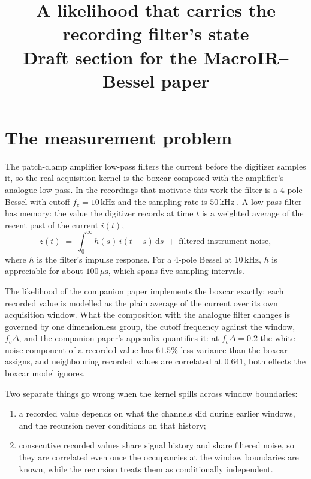 \documentclass[11pt]{article}
\title{A likelihood that carries the recording filter's state\\[4pt]
Draft section for the MacroIR--Bessel paper}
\author{}
\date{}
\begin{document}
\maketitle

\newcommand{\E}{\mathbb{E}}
\newcommand{\Var}{\operatorname{Var}}
\newcommand{\Cov}{\operatorname{Cov}}
\newcommand{\diag}{\operatorname{diag}}
\newcommand{\Nch}{N_{\mathrm{ch}}}
\newcommand{\N}{\mathbf{N}}
\newcommand{\ff}{\bm{\varphi}}
\newcommand{\Af}{\mathbf{A}_{\mathrm{f}}}
\newcommand{\bff}{\mathbf{b}_{\mathrm{f}}}
\newcommand{\cf}{\mathbf{c}_{\mathrm{f}}}

\section{The measurement problem}

The patch-clamp amplifier low-pass filters the current before the digitizer
samples it, so the real acquisition kernel is the boxcar composed with the
amplifier's analogue low-pass. In the recordings that motivate this work
the filter is a 4-pole Bessel with cutoff $f_c = 10\,\mathrm{kHz}$ and the
sampling rate is $50\,\mathrm{kHz}$ \cite{moffatt2007}. A low-pass filter
has memory: the value the digitizer records at time $t$ is a weighted
average of the recent past of the current $i(t)$,
\begin{equation}
  z(t) \;=\; \int_0^{\infty} h(s)\, i(t-s)\,\mathrm{d}s
  \;+\; \text{filtered instrument noise},
  \label{eq:conv}
\end{equation}
where $h$ is the filter's impulse response. For a 4-pole Bessel at
$10\,\mathrm{kHz}$, $h$ is appreciable for about $100\,\mu\mathrm{s}$,
which spans five sampling intervals.

The likelihood of the companion paper \cite{macroir2026} implements the
boxcar exactly: each recorded value is modelled as the plain average of the
current over its own acquisition window. What the composition with the
analogue filter changes is governed by one dimensionless group, the cutoff
frequency against the window, $f_c\Delta$, and the companion paper's
appendix quantifies it: at $f_c\Delta = 0.2$ the white-noise component of a
recorded value has $61.5\%$ less variance than the boxcar assigns, and
neighbouring recorded values are correlated at $0.641$, both effects the
boxcar model ignores.

Two separate things go wrong when the kernel spills across window
boundaries:
\begin{enumerate}
  \item a recorded value depends on what the channels did during earlier
    windows, and the recursion never conditions on that history;
  \item consecutive recorded values share signal history and share
    filtered noise, so they are correlated even once the occupancies at
    the window boundaries are known, while the recursion treats them as
    conditionally independent.
\end{enumerate}
\end{document}
